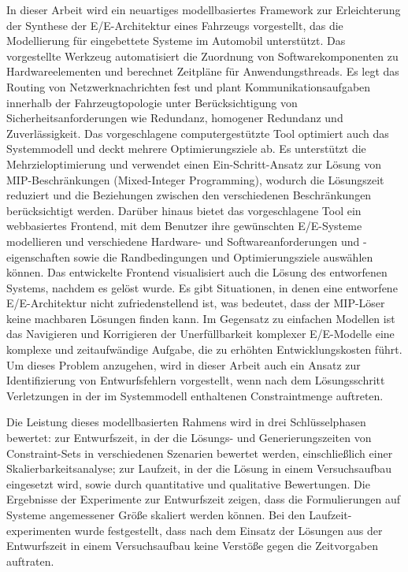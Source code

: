         In dieser Arbeit wird ein neuartiges modellbasiertes Framework zur Erleichterung der Synthese der E/E-Architektur eines Fahrzeugs vorgestellt, das die Modellierung für eingebettete Systeme im Automobil unterstützt. Das vorgestellte Werkzeug automatisiert die Zuordnung von Softwarekomponenten zu Hardwareelementen und berechnet Zeitpläne für Anwendungsthreads. Es legt das Routing von Netzwerknachrichten fest und plant Kommunikationsaufgaben innerhalb der Fahrzeugtopologie unter Berücksichtigung von Sicherheitsanforderungen wie Redundanz, homogener Redundanz und Zuverlässigkeit.
        Das vorgeschlagene computergestützte Tool optimiert auch das Systemmodell und deckt mehrere Optimierungsziele ab. Es unterstützt die Mehrzieloptimierung und verwendet einen Ein-Schritt-Ansatz zur Lösung von MIP-Beschränkungen (Mixed-Integer Programming), wodurch die Lösungszeit reduziert und die Beziehungen zwischen den verschiedenen Beschränkungen berücksichtigt werden. Darüber hinaus bietet das vorgeschlagene Tool ein webbasiertes Frontend, mit dem Benutzer ihre gewünschten E/E-Systeme modellieren und verschiedene Hardware- und Softwareanforderungen und -eigenschaften sowie die Randbedingungen und Optimierungsziele auswählen können. Das entwickelte Frontend visualisiert auch die Lösung des entworfenen Systems, nachdem es gelöst wurde.
%
        Es gibt Situationen, in denen eine entworfene E/E-Architektur nicht zufriedenstellend ist, was bedeutet, dass der MIP-Löser keine machbaren Lösungen finden kann. Im Gegensatz zu einfachen Modellen ist das Navigieren und Korrigieren der Unerfüllbarkeit komplexer E/E-Modelle eine komplexe und zeitaufwändige Aufgabe, die zu erhöhten Entwicklungskosten führt. Um dieses Problem anzugehen, wird in dieser Arbeit auch ein Ansatz zur Identifizierung von Entwurfsfehlern vorgestellt, wenn nach dem Lösungsschritt Verletzungen in der im Systemmodell enthaltenen Constraintmenge auftreten.
    
        Die Leistung dieses modellbasierten Rahmens wird in drei Schlüsselphasen bewertet: zur Entwurfszeit, in der die Lösungs- und Generierungszeiten von Constraint-Sets in verschiedenen Szenarien bewertet werden, einschließlich einer Skalierbarkeitsanalyse; zur Laufzeit, in der die Lösung in einem Versuchsaufbau eingesetzt wird, sowie durch quantitative und qualitative Bewertungen. Die Ergebnisse der Experimente zur Entwurfszeit zeigen, dass die Formulierungen auf Systeme angemessener Größe skaliert werden können. Bei den Laufzeit-experimenten wurde festgestellt, dass nach dem Einsatz der Lösungen aus der Entwurfszeit in einem Versuchsaufbau keine Verstöße gegen die Zeitvorgaben auftraten.

